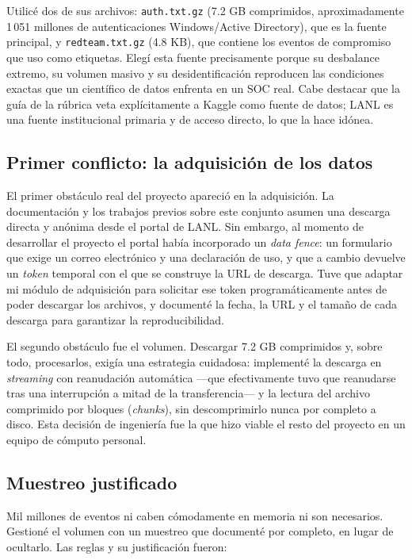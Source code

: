 \documentclass[12pt, a4paper]{article}
\begin{document}
Utilicé dos de sus archivos: \texttt{auth.txt.gz} (7.2 GB comprimidos, aproximadamente 1\,051
millones de autenticaciones Windows/Active Directory), que es la fuente principal, y
\texttt{redteam.txt.gz} (4.8 KB), que contiene los eventos de compromiso que uso como etiquetas. Elegí
esta fuente precisamente porque su desbalance extremo, su volumen masivo y su desidentificación
reproducen las condiciones exactas que un científico de datos enfrenta en un SOC real. Cabe destacar
que la guía de la rúbrica veta explícitamente a Kaggle como fuente de datos; LANL es una fuente
institucional primaria y de acceso directo, lo que la hace idónea.

\subsection{Primer conflicto: la adquisición de los datos}

El primer obstáculo real del proyecto apareció en la adquisición. La documentación y los trabajos
previos sobre este conjunto asumen una descarga directa y anónima desde el portal de LANL. Sin
embargo, al momento de desarrollar el proyecto el portal había incorporado un \textit{data fence}:
un formulario que exige un correo electrónico y una declaración de uso, y que a cambio devuelve un
\textit{token} temporal con el que se construye la URL de descarga. Tuve que adaptar mi módulo de
adquisición para solicitar ese token programáticamente antes de poder descargar los archivos, y
documenté la fecha, la URL y el tamaño de cada descarga para garantizar la reproducibilidad.

El segundo obstáculo fue el volumen. Descargar 7.2 GB comprimidos y, sobre todo, procesarlos, exigía
una estrategia cuidadosa: implementé la descarga en \textit{streaming} con reanudación automática
---que efectivamente tuvo que reanudarse tras una interrupción a mitad de la transferencia--- y la
lectura del archivo comprimido por bloques (\textit{chunks}), sin descomprimirlo nunca por completo
a disco. Esta decisión de ingeniería fue la que hizo viable el resto del proyecto en un equipo de
cómputo personal.

\subsection{Muestreo justificado}

Mil millones de eventos ni caben cómodamente en memoria ni son necesarios. Gestioné el volumen con un
muestreo que documenté por completo, en lugar de ocultarlo. Las reglas y su justificación fueron:
\end{document}
